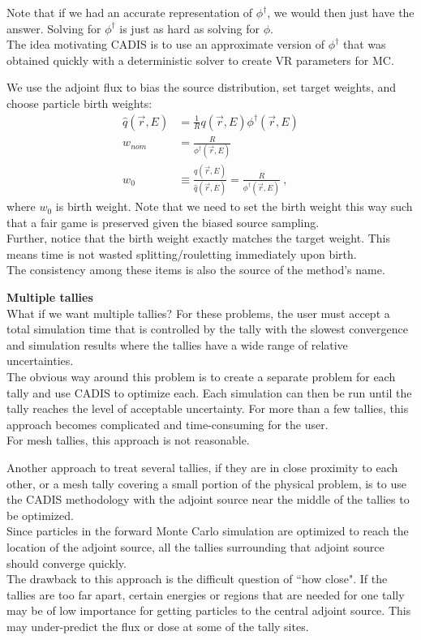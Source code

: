 \documentclass[12pt]{article}
\begin{document}
Note that if we had an accurate representation of $\phi^{\dagger}$, we would then just have the answer. Solving for $\phi^{\dagger}$ is just as hard as solving for $\phi$. \\
The idea motivating CADIS is to use an approximate version of $\phi^{\dagger}$ that was obtained quickly with a deterministic solver to create VR parameters for MC. 

We use the adjoint flux to bias the source distribution, set target weights, and choose particle birth weights:
\begin{align*}
\hat{q}(\vec{r}, E) &= \frac{1}{R} q(\vec{r}, E)\phi^{\dagger}(\vec{r}, E) \\
w_{nom} &= \frac{R}{\phi^{\dagger}(\vec{r}, E)}\\
w_0 &\equiv \frac{q(\vec{r}, E)}{\hat{q}(\vec{r}, E)} = \frac{R}{\phi^{\dagger}(\vec{r}, E)}\:,
\end{align*}
%
where $w_0$ is birth weight. Note that we need to set the birth weight this way such that a fair game is preserved given the biased source sampling.\\
Further, notice that the birth weight exactly matches the target weight. This means time is not wasted splitting/rouletting immediately upon birth.\\
The consistency among these items is also the source of the method's name.

\textbf{Multiple tallies}\\
What if we want multiple tallies? For these problems, the user must accept a total simulation time that is controlled by the tally with the slowest convergence and simulation results where the tallies have a wide range of relative uncertainties.\\
The obvious way around this problem is to create a separate problem for each tally and use
CADIS to optimize each. Each simulation can then be run until the tally reaches the level of acceptable uncertainty. For more than a few tallies, this approach becomes complicated and time-consuming for the user. \\
For mesh tallies, this approach is not reasonable.

Another approach to treat several tallies, if they are in close proximity to each other, or a mesh tally covering a small portion of the physical problem, is to use the CADIS methodology with the adjoint source near the middle of the tallies to be optimized.\\
Since particles in the forward Monte Carlo simulation are optimized to reach the location of the adjoint source, all the tallies surrounding that adjoint source should converge quickly. \\
The drawback to this approach is the difficult question of ``how close". If the tallies are too far apart, certain energies or regions that are needed for one tally may be of low importance for getting particles to the central adjoint source. This may under-predict the flux or dose at some of the tally sites.
\end{document}
